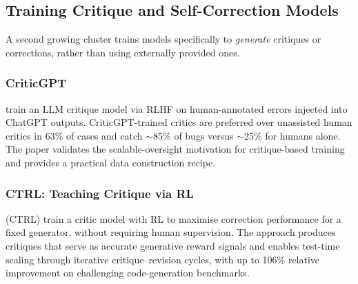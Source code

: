 \subsection{Training Critique and Self-Correction Models}
\label{sec:critique-rl}

A second growing cluster trains models specifically to \emph{generate}
critiques or corrections, rather than using externally provided ones.

\subsubsection{CriticGPT}

\autocite{mcaleese2024llmcriticshelpllm} train an LLM critique model
via RLHF on human-annotated errors injected into ChatGPT outputs.
CriticGPT-trained critics are preferred over unassisted human critics
in 63\% of cases and catch $\sim$85\% of bugs versus $\sim$25\% for
humans alone.  The paper validates the scalable-oversight motivation
for critique-based training and provides a practical data construction
recipe.



\subsubsection{CTRL: Teaching Critique via RL}

\autocite{xie2025teachinglanguagemodelscritique} (CTRL) train a
critic model with RL to maximise correction performance for a fixed
generator, without requiring human supervision.  The approach produces
critiques that serve as accurate generative reward signals and enables
test-time scaling through iterative critique–revision cycles, with up
to 106\% relative improvement on challenging code-generation
benchmarks.

